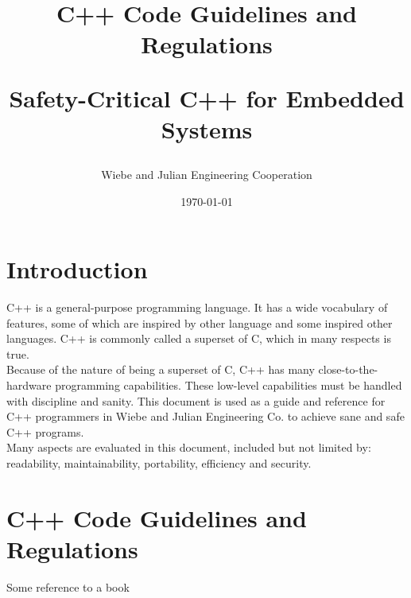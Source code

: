 \documentclass[11pt]{article}
\title{
      C++ Code Guidelines and Regulations \\
      \begin{large}
         Safety-Critical C++ for Embedded Systems
      \end{large}
}
\date{\today}
\author{Wiebe and Julian Engineering Cooperation}
\begin{document}
\maketitle

\newpage
{} %
\tableofcontents
\newpage
{} %

\newpage
\section{Introduction}
C++ is a general-purpose programming language. It has a wide vocabulary of
features, some of which are inspired by other language and some inspired other
languages. C++ is commonly called a superset of C, which in many respects
is true.\\
Because of the nature of being a superset of C, C++ has many close-to-the-
hardware programming capabilities. These low-level capabilities must be handled
with discipline and sanity. This document is used as a guide and reference for
C++ programmers in Wiebe and Julian Engineering Co. to achieve sane and safe
C++ programs.\\
Many aspects are evaluated in this document, included but not limited by:
readability, maintainability, portability, efficiency and security.

\section{C++ Code Guidelines and Regulations}
Some reference to a book \cite{DUMMY:1}

\newpage
\printbibliography

\newpage
\begin{appendix}
\end{appendix}
\end{document}
